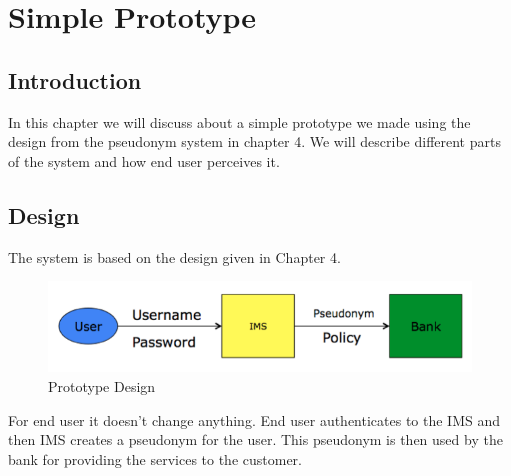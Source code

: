 \chapter{Simple Prototype}
\section{Introduction}
In this chapter we will discuss about a simple prototype we made using the design from the pseudonym system in chapter 4. We will describe different parts of the system and how end user perceives it.
\section{Design}
The system is based on the design given in Chapter 4. 
\begin{figure}[h]
	\centering
	\includegraphics[width=\textwidth]{figures/Pseudonym}
	\caption{Prototype Design}
	\label{fig:Pseudonym}
\end{figure}
For end user it doesn't change anything. End user authenticates to the IMS and then IMS creates a pseudonym for the user. This pseudonym is then used by the bank for providing the services to the customer.
